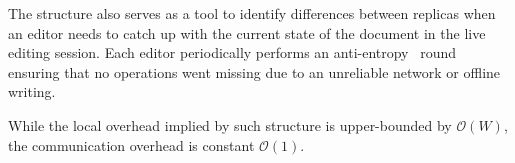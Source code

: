 %   




The structure also serves as a tool to identify differences between replicas
when an editor needs to catch up with the current state of the document in the
live editing session.  Each editor periodically performs an
anti-entropy~\cite{demers1987epidemic} round ensuring that no operations went
missing due to an unreliable network or offline writing.


While the local overhead implied by such structure is upper-bounded by
$\mathcal{O}(W)$, the communication overhead is constant $\mathcal{O}(1)$.



